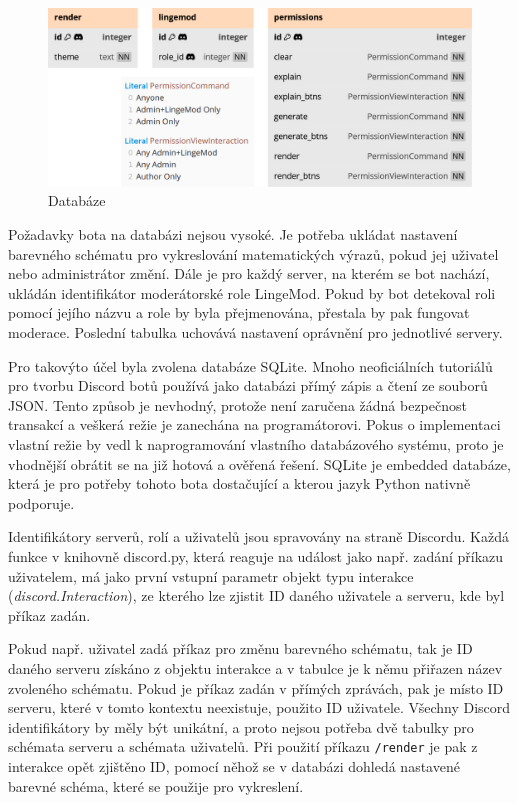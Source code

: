 \documentclass[FM]{tulthesis}
\begin{document}
	\begin{figure}[ht]
		\centering
		\includegraphics[width=\textwidth]{img/Database}
		\caption{Databáze}
		\label{_tag_img_db}
	\end{figure}
	
	Požadavky bota na databázi nejsou vysoké. Je potřeba ukládat nastavení barevného schématu pro vykreslování matematických výrazů, pokud jej uživatel nebo administrátor změní. Dále je pro každý server, na kterém se bot nachází, ukládán identifikátor moderátorské role LingeMod. Pokud by bot detekoval roli pomocí jejího názvu a role by byla přejmenována, přestala by pak fungovat moderace. Poslední tabulka uchovává nastavení oprávnění pro jednotlivé servery.
	
	Pro takovýto účel byla zvolena databáze SQLite. Mnoho neoficiálních tutoriálů pro tvorbu Discord botů používá jako databázi přímý zápis a čtení ze souborů JSON. Tento způsob je nevhodný, protože není zaručena žádná bezpečnost transakcí a veškerá režie je zanechána na programátorovi. Pokus o implementaci vlastní režie by vedl k naprogramování vlastního databázového systému, proto je vhodnější obrátit se na již hotová a ověřená řešení. SQLite je embedded databáze, která je pro potřeby tohoto bota dostačující a kterou jazyk Python nativně podporuje.
	
	Identifikátory serverů, rolí a uživatelů jsou spravovány na straně Discordu. Každá funkce v knihovně discord.py, která reaguje na událost jako např. zadání příkazu uživatelem, má jako první vstupní parametr objekt typu interakce (\textit{discord.Interaction}), ze kterého lze zjistit ID daného uživatele a serveru, kde byl příkaz zadán. 
	
	Pokud např. uživatel zadá příkaz pro změnu barevného schématu, tak je ID daného serveru získáno z objektu interakce a v tabulce je k němu přiřazen název zvoleného schématu. Pokud je příkaz zadán v přímých zprávách, pak je místo ID serveru, které v tomto kontextu neexistuje, použito ID uživatele. Všechny Discord identifikátory by měly být unikátní, a proto nejsou potřeba dvě tabulky pro schémata serveru a schémata uživatelů. Při použití příkazu \verb|/render| je pak z interakce opět zjištěno ID, pomocí něhož se v databázi dohledá nastavené barevné schéma, které se použije pro vykreslení.
	
\end{document}
